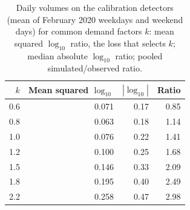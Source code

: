 \begin{table}[htbp]\centering
\caption{Daily volumes on the calibration detectors (mean of February 2020 weekdays and weekend days) for common demand factors $k$: mean squared $\log_{10}$ ratio, the loss that selects $k$; median absolute $\log_{10}$ ratio; pooled simulated/observed ratio.}
\label{tab:scan}
\begin{tabular}{@{}rrrr@{}}\toprule
$k$ & Mean squared $\log_{10}$ & $|\log_{10}|$ & Ratio \\\midrule
0.6 & 0.071 & 0.17 & 0.85 \\
0.8 & 0.063 & 0.18 & 1.14 \\
1.0 & 0.076 & 0.22 & 1.41 \\
1.2 & 0.100 & 0.25 & 1.68 \\
1.5 & 0.146 & 0.33 & 2.09 \\
1.8 & 0.195 & 0.40 & 2.49 \\
2.2 & 0.258 & 0.47 & 2.98 \\
\bottomrule\end{tabular}\end{table}
